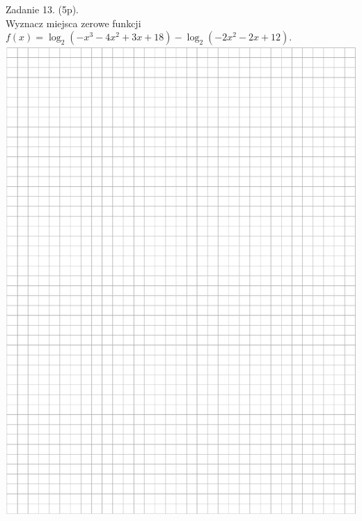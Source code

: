 \documentclass[10pt]{article}
\begin{document}
Zadanie 13. (5p).\\
Wyznacz miejsca zerowe funkcji \(f(x)=\log _{2}\left(-x^{3}-4 x^{2}+3 x+18\right)-\log _{2}\left(-2 x^{2}-2 x+12\right)\).\\
\includegraphics[max width=\textwidth, center]{2024_11_21_498389c978c770348ebcg-11}
\end{document}
